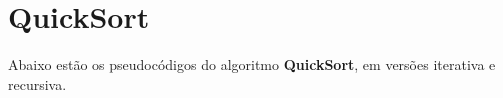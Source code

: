 \section{QuickSort}
Abaixo estão os pseudocódigos do algoritmo \textbf{QuickSort}, em versões iterativa e recursiva.


